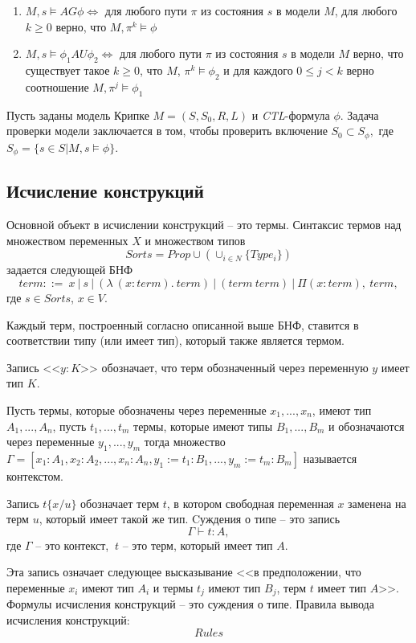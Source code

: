 \documentclass[12pt]{article}
\begin{document}
\begin{enumerate}
    \item $M, s \vDash AG\phi \Leftrightarrow$ для любого пути $\pi$ из состояния $s$ в модели $M$, для любого $k \geq 0$ верно, что $M, \pi^{k} \vDash \phi$ 
    
    \item $M, s \vDash \phi_1 AU \phi_2 \Leftrightarrow$ для любого пути $\pi$ из состояния $s$ в модели $M$ верно, что существует такое $k \geq 0$, что $M$, $\pi^{k} \vDash \phi_2$ и для каждого $0 \leq j < k$ верно соотношение $M, \pi^{j} \vDash \phi_1$
    
\end{enumerate}

Пусть заданы модель Крипке $M = (S, S_0, R, L)$ и \textit{CTL}-формула $\phi$. Задача проверки модели заключается в том, чтобы проверить включение $S_0 \subset S_{\phi},$ где $S_{\phi} = \{s \in S | M,s \vDash \phi \}$. 


\subsection{Исчисление конструкций}
Основной объект в исчислении конструкций -- это термы.
Синтаксис термов над множеством переменных $X$ 
и множеством типов 
$$Sorts={Prop} \cup (\cup_{i \in N} \{Type_i\})$$
задается следующей БНФ 
$$term ::=\ x\ |\ s\ |\ (\lambda\ (x : term).\ term)\ |\ (term\ term)\ |\ \Pi (x:term),\ term,$$ 
где $s \in Sorts$, $x \in V$.

Каждый терм, построенный согласно описанной выше БНФ, 
ставится в соответствии типу (или имеет тип), который также является термом.

Запись <<$y:K$>> обозначает, что терм обозначенный через переменную $y$ имеет тип $K$.

Пусть термы, которые обозначены через переменные $x_1, ..., x_n$, 
имеют тип $A_1, ..., A_n$, пусть $t_1, ..., t_m$ термы, которые имеют типы $B_1, ..., B_m$ и обозначаются через переменные $y_1, ..., y_m$ тогда множество $\Gamma = [x_1:A_1, x_2:A_2, ..., x_n: A_n, y_1:= t_1:B_1, ..., y_m:= t_m:B_m]$ называется контекстом.

Запись $t\{x/u\}$ обозначает терм $t$, в котором свободная переменная $x$ заменена на терм $u$, который имеет такой же тип.
Cуждения о типе -- это запись 
$$\Gamma \vdash t: A,$$ 
где $\Gamma$ -- это контекст, $\ t$ -- это терм, который имеет тип $A$.

Эта запись означает следующее высказывание
<<в предположении, 
что переменные $x_i$ имеют тип $A_i$ и термы $t_j$ имеют тип $B_j$, терм $t$ имеет тип $A$>>.
Формулы исчисления конструкций -- это суждения о типе.
Правила вывода исчисления конструкций:
$$Rules$$
\end{document}
